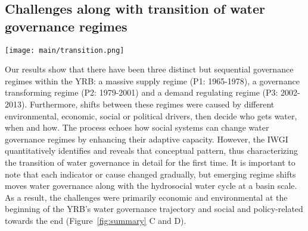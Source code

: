 \subsection{Challenges along with transition of water governance regimes}

\begin{figure*}[htbp!]
	\centering
	\texttt{[image: main/transition.png]}
	\caption{
		Transition schema of water governance during transformation towards a hydrosocial water cycle. The natural water cycle dominates blue pathways while socio-economic feedbacks dominate red pathways. Finally, there is a transformation towards the hydrosocial water cycle where red loop increases.
		\textbf{A. Early phase.} As socio-economic systems develop, industry and services gradually demand increasing amounts of water; at the same time, increasing social organization and technological capacity allow people to manage water resources more intensively, including intensive intervention in the natural water cycle.
		\textbf{B. Late phase} With further developed and economically efficient industries and services, trade-offs between provisioning-purpose and non-provisioning water use become prominent. Rather than being determined by local socio-economic systems, water withdraws and management are scaled up to the entire basin.
		Thus, \textbf{C. Transformation from a natural water cycle towards the hydro-social water cycle} occurs in paralleled with a transformation towards a hydrosocial water cycle. This is generally distinguished when water resource limits are reached. The three water governance regimes seen in the YRB are identified along this transition (Regime 1: massive supply regime, Regime 2: purpose-focused regime, Regime 3: many-sided governance regime).
		\textbf{D. Water governance challenges} Through the transitional regimes, water governance faces primarily economic and environmental challenges in the early phase and social and policy challenges in the late phase.
	}
	\label{fig:summary}
\end{figure*}

Our results show that there have been three distinct but sequential governance regimes within the YRB: a massive supply regime (P1: 1965-1978), a governance transforming regime (P2: 1979-2001) and a demand regulating regime (P3: 2002-2013). 
Furthermore, shifts between these regimes were caused by different environmental, economic, social or political drivers, then decide who gets water, when and how.
The process echoes how social systems can change water governance regimes by enhancing their adaptive capacity. %
However, the IWGI quantitatively identifies and reveals that conceptual pattern, thus characterizing the transition of water governance in detail for the first time.
It is important to note that each indicator or cause changed gradually, but emerging regime shifts moves water governance along with the hydrosocial water cycle at a basin scale.
As a result, the challenges were primarily economic and environmental at the beginning of the YRB's water governance trajectory and social and policy-related towards the end (Figure~\ref{fig:summary} C and D).

